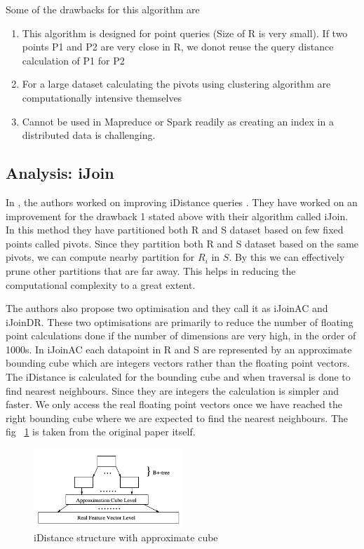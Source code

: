 \documentclass[conference]{IEEEtran}
\begin{document}
Some of the drawbacks for this algorithm are
\begin{enumerate}
\item This algorithm is designed for point queries (Size of R
  is very small). If two points P1 and P2 are very close in R, we donot reuse the query
distance calculation of P1 for P2
\item For a large dataset calculating the pivots using clustering algorithm are
  computationally intensive themselves
\item Cannot be used in Mapreduce or Spark readily as creating an
  index in a distributed data is challenging.
\end{enumerate}

\bigskip

\subsection{Analysis: iJoin}
In \cite{yu_efficient_2007}, the authors worked on improving iDistance queries
\cite{jagadish_idistance:_2005}. They have worked on an improvement for the drawback 1 stated
above with their algorithm called iJoin. In this method they have
partitioned both R and S dataset based on few fixed points called
pivots. Since they partition both R and S dataset based on the same
pivots, we can compute nearby partition for $R_i$ in $S$. By this we
can effectively prune other partitions that are far away. This helps
in reducing the computational complexity to a great extent.

\bigskip

The authors also propose two optimisation and they call it as iJoinAC
and iJoinDR. These two optimisations are primarily to reduce the
number of floating point calculations done if the number of dimensions
are very high, in the order of 1000s. In iJoinAC each datapoint in R
and S are represented by an approximate bounding cube which are
integers vectors rather than the floating point vectors. The iDistance
is calculated for the bounding cube and when traversal is done to find
nearest neighbours. Since they are integers the calculation is simpler
and faster. We only access the real floating point vectors once we have reached the
right bounding cube where we are expected to find the nearest
neighbours. The fig ~\ref{fig:iJoinAC} is taken from the original
paper itself.

\begin{figure}[here]
\includegraphics[width=0.5\textwidth]{iJoinAC.png}
\caption{iDistance structure with approximate cube}
\label{fig:iJoinAC}
\end{figure}
\end{document}
